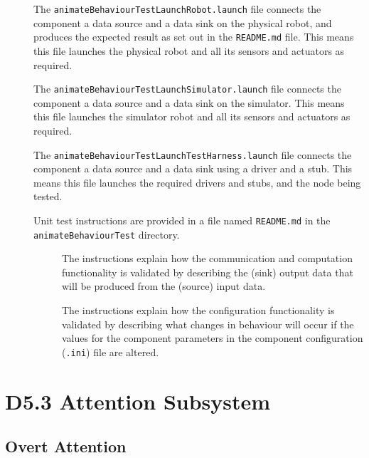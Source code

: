 \documentclass{CSSRforAfrica}
\newcommand{\checkboxChecked}{\fbox{\ding{51}}} %
\newcommand{\checkboxDashed}{\fbox{--}}         %
\begin{document}
\begin{description}
\item[\checkboxChecked] The {\small \verb+animateBehaviourTestLaunchRobot.launch+} file  connects the component a data source and a data sink on the physical robot, and produces the expected result as set out in the  {\small \verb+README.md+}  file.    This means this file launches the physical robot and all its sensors and actuators as required.

\item[\checkboxDashed] The {\small \verb+animateBehaviourTestLaunchSimulator.launch+} file  connects the component a data source and a data sink on the simulator.   This means this file launches the simulator robot and all its sensors and actuators as required.

\item[\checkboxChecked] The {\small \verb+animateBehaviourTestLaunchTestHarness.launch+} file  connects the component a data source and a data sink using a driver and a stub.   This means this file launches the required drivers and stubs, and the node being tested.

\item[\checkboxChecked] Unit test instructions are provided in a file named {\small \verb+README.md+} in the  {\small \verb+animateBehaviourTest+} directory. 


\begin{description}

\item[\checkboxChecked] The instructions explain how the communication and computation functionality is validated by describing the (sink) output data that will be produced from the (source) input data.  

\item[\checkboxChecked] The instructions explain how the configuration functionality is validated by describing what changes in behaviour will occur if the values for the component parameters in the component configuration ({\small \verb+.ini+}) file are altered.

\end{description}

\end{description} 

  


\newpage
\section{D5.3 Attention Subsystem} 
\subsection{Overt Attention} 
\label{subsection:overt_attention}
\end{document}
